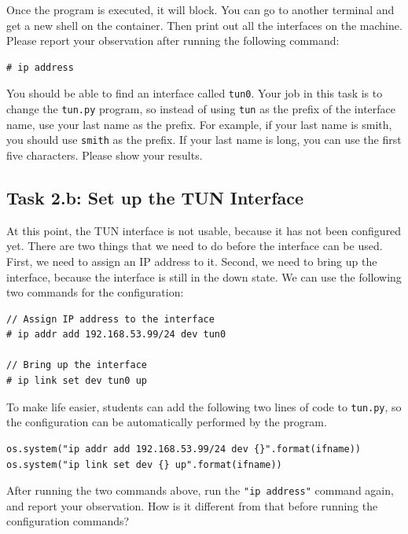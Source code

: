 Once the program is executed, it will block. You can go to 
another terminal and get a new shell on the container. 
Then print out all the interfaces on the machine. Please 
report your observation after running the following command:

\begin{lstlisting}
# ip address
\end{lstlisting}
 

You should be able to find an interface called \texttt{tun0}. Your job 
in this task is to change the \texttt{tun.py} program, so 
instead of using \texttt{tun}  as the prefix of the interface name, use
your last name as the prefix. For example, if your last name is smith, 
you should use \texttt{smith} as the prefix.  If your last name is long,
you can use the first five characters. Please show your results. 
 


\subsection{Task 2.b: Set up the TUN Interface}


At this point, the TUN interface is not usable, because it has not been configured yet. 
There are two things that we need to do before the interface can be used. First, we 
need to assign an IP address to it. Second, we need to bring up the interface, because
the interface is still in the down state. We can use the following two commands
for the configuration: 


\begin{lstlisting}
// Assign IP address to the interface 
# ip addr add 192.168.53.99/24 dev tun0

// Bring up the interface
# ip link set dev tun0 up
\end{lstlisting}
 

To make life easier, students can add the following two lines of code
to \texttt{tun.py}, so the configuration can be automatically
performed by the program. 


\begin{lstlisting}
os.system("ip addr add 192.168.53.99/24 dev {}".format(ifname)) 
os.system("ip link set dev {} up".format(ifname))              
\end{lstlisting}



After running the two commands above, run the \texttt{"ip address"} command 
again, and report your observation. How is it different from
that before running the configuration commands?



